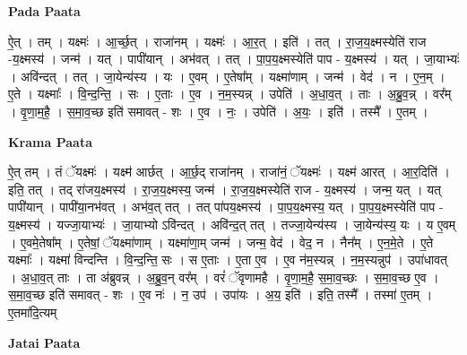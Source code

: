 \documentclass[17pt]{extarticle}
\begin{document}
\textbf{Pada Paata} \newline

ऐ॒त् । तम् । यक्ष्मः॑ । आ॒र्च्छ॒त् । राजा॑नम् । यक्ष्मः॑ । आ॒र॒त् । इति॑ । तत् । रा॒ज॒य॒क्ष्मस्येति॑ राज -य॒क्ष्मस्य॑ । जन्म॑ । यत् । पापी॑यान् । अभ॑वत् । तत् । पा॒प॒य॒क्ष्मस्येति॑ पाप - य॒क्ष्मस्य॑ । यत् । जा॒याभ्यः॑ । अवि॑न्दत् । तत् । जा॒येन्य॑स्य । यः । ए॒वम् । ए॒तेषा᳚म् । यक्ष्मा॑णाम् । जन्म॑ । वेद॑ । न ।  ए॒न॒म् । ए॒ते । यक्ष्माः᳚ । वि॒न्द॒न्ति॒ । सः । ए॒ताः । ए॒व । न॒म॒स्यन्न् । उपेति॑ । अ॒धा॒व॒त् । ताः । अ॒ब्रु॒व॒न्न् । वर᳚म् । वृ॒णा॒म॒है॒ । स॒मा॒व॒च्छ इति॑ समावत् - शः । ए॒व । नः॒ । उपेति॑ । अ॒यः॒ । इति॑ । तस्मै᳚ । ए॒तम् ।  \newline


\textbf{Krama Paata} \newline

ऐ॒त् तम् । तं ॅयक्ष्मः॑ । यक्ष्म॑ आर्छत् । आ॒र्छ॒द् राजा॑नम् । राजा॑नं॒ ॅयक्ष्मः॑ । यक्ष्म॑ आरत् । आ॒र॒दिति॑ । इति॒ तत् । तद् रा॑जय॒क्ष्मस्य॑ । रा॒ज॒य॒क्ष्मस्य॒ जन्म॑ । रा॒ज॒य॒क्ष्मस्येति॑ राज - य॒क्ष्मस्य॑ । जन्म॒ यत् । यत् पापी॑यान् । पापी॑या॒नभ॑वत् । अभ॑व॒त् तत् । तत् पा॑पय॒क्ष्मस्य॑ । पा॒प॒य॒क्ष्मस्य॒ यत् । पा॒प॒य॒क्ष्मस्येति॑ पाप - य॒क्ष्मस्य॑ । यज्जा॒याभ्यः॑ । जा॒याभ्यो ऽवि॑न्दत् । अवि॑न्द॒त् तत् । तज्जा॒येन्य॑स्य । जा॒येन्य॑स्य॒ यः । य ए॒वम् । ए॒वमे॒तेषा᳚म् । ए॒तेषां॒ ॅयक्ष्मा॑णाम् । यक्ष्मा॑णा॒म् जन्म॑ । जन्म॒ वेद॑ । वेद॒ न । नैन᳚म् । ए॒न॒मे॒ते । ए॒ते यक्ष्माः᳚ । यक्ष्मा॑ विन्दन्ति । वि॒न्द॒न्ति॒ सः । स ए॒ताः । ए॒ता ए॒व । ए॒व न॑म॒स्यन्न् । न॒म॒स्यन्नुप॑ । उपा॑धावत् । अ॒धा॒व॒त् ताः । ता अ॑ब्रुवन्न् । अ॒ब्रु॒व॒न् वर᳚म् । वरं॑ ॅवृणामहै । वृ॒णा॒म॒है॒ स॒मा॒व॒च्छः । स॒मा॒व॒च्छ ए॒व । स॒मा॒व॒च्छ इति॑ समावत् - शः । ए॒व नः॑ । न॒ उप॑ । उपा॑यः । अ॒य॒ इति॑ । इति॒ तस्मै᳚ । तस्मा॑ ए॒तम् । ए॒तमा॑दि॒त्यम् \newline

\textbf{Jatai Paata} \newline
\end{document}
